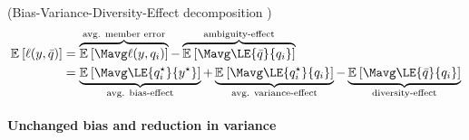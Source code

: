 \documentclass[../main.tex]{subfiles}
\begin{document}
\begin{theorem} (Bias-Variance-Diversity-Effect decomposition \cite{wood_UnifiedTheoryDiversity_2023})
    \label{thm:bias-variance-diversity-effect-decomp}
\begin{align*}
\mathbb{E}_{}\left[ \ell(y, \bar{q} ) \right]  &=  
\overbrace{
\mathbb{E}_{}\left[ 
    \Mavg \ell(y, q_{i} ) 
\right]
}^{\text{avg. member error}}
-  
    \overbrace{
\mathbb{E}_{}\left[ 
        \Mavg \LE{\bar{q}}{q_{i}}  
    \right]  
    }^{\text{ambiguity-effect}} \\
&= 
    \underbrace{
\mathbb{E}_{}\left[ 
        \Mavg \LE{q_{i}^\star}{y^\star }
     \right]  
    }_{\text{avg. bias-effect}}
+
    \underbrace{
\mathbb{E}_{}\left[ 
        \Mavg \LE{q_{i}^\star}{q_{i}}  
\right]
    }_{\text{avg. variance-effect}}
-
    \underbrace{
 \mathbb{E}_{}\left[ 
        \Mavg \LE{\bar{q}}{q_{i}} 
\right] 
    }_{\text{diversity-effect}}
\end{align*}
\end{theorem}

\paragraph{Unchanged bias and reduction in variance}
\label{sec:unchanged-bias}
\end{document}
